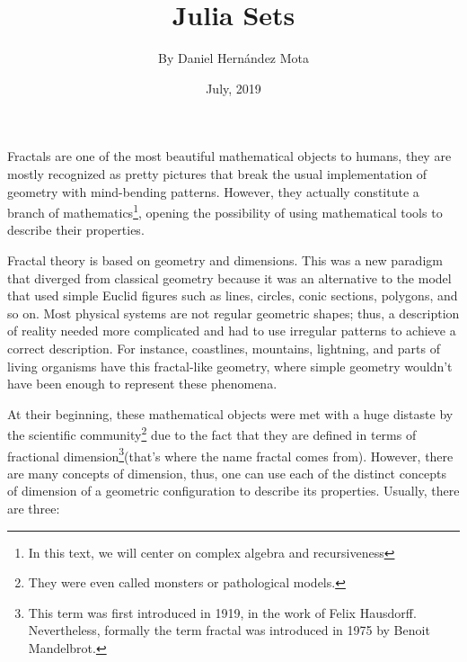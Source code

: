 \documentclass{article}
\title{Julia Sets}
\author{By Daniel Hernández Mota}
\date{July, 2019}
\begin{document}
\maketitle

\newpage
Fractals are one of the most beautiful mathematical objects to humans, they are mostly recognized as pretty pictures that break the usual implementation of geometry with mind-bending patterns. However, they actually constitute a branch of mathematics\footnote{In this text, we will center on complex algebra and recursiveness}, opening the possibility of using mathematical tools to describe their properties\cite{Edyta}. 

Fractal theory is based on geometry and dimensions. This was a new paradigm that diverged from classical geometry because it was an alternative to the model that used simple Euclid figures such as lines, circles, conic sections, polygons, and so on. Most physical systems are not regular geometric shapes; thus, a description of reality needed more complicated and had to use irregular patterns to achieve a correct description\cite{Crownover}. For instance, coastlines, mountains, lightning, and parts of living organisms have this fractal-like geometry, where simple geometry wouldn't have been enough to represent these phenomena\cite{Edyta}.

At their beginning, these mathematical objects were met with a huge distaste by the scientific community\footnote{They were even called monsters or pathological models.} due to the fact that they are defined in terms of fractional dimension\footnote{This term was first introduced in 1919, in the work of Felix Hausdorff. Nevertheless, formally the term fractal was introduced in 1975 by Benoit Mandelbrot.}(that's where the name fractal comes from). However, there are many concepts of dimension, thus, one can use each of the distinct concepts of dimension of a geometric configuration to describe its properties. Usually, there are three\cite{Crownover}:
\end{document}

